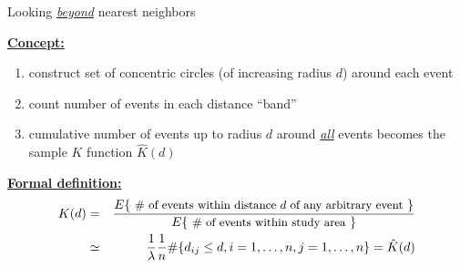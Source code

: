 \documentclass[portrait]{seminar}
\begin{document}
%
%
\begin{slide*}
\begin{center}
 \vspace*{-0.5cm} 
\end{center}
\begin{center}
Looking \underline{\emph{beyond}} nearest neighbors
\end{center}

\vspace{0.2cm} \underline{\textbf{Concept:}}
\begin{enumerate}
\item construct set of concentric circles
(of increasing radius $d$) around each event
\item count number of events in each distance ``band''
\item cumulative number of events up to radius $d$
around {\it \underline{all}} events becomes the sample $K$ function
$\hat{K}(d)$
\end{enumerate}

\vspace{0.0cm}
\begin{center}
\begin{figure}
\end{figure}
\end{center}

\vspace{0.1cm} \underline{\textbf{Formal definition:}}
\begin{eqnarray*}
K(d) & = & \frac { E\{ \mbox{ {\small \# of events within distance
$d$ of any arbitrary event} } \} }
{ E\{ \mbox{ {\small \# of events within study area} } \} } \\
& \simeq & \frac{1}{\lambda} \frac{1}{n} \#\{d_{ij} \leq d,
i=1,\ldots,n, j=1,\ldots,n \} = \hat{K}(d)
\end{eqnarray*}

\end{slide*}
\end{document}
